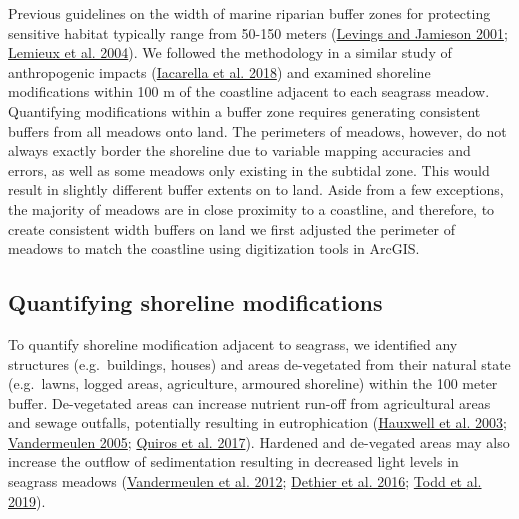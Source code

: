 \documentclass[12pt]{article}\usepackage[]{graphicx}\usepackage[]{color}
\begin{document}
Previous guidelines on the width of marine riparian buffer zones for protecting sensitive habitat typically range from 50-150 meters (\protect\hyperlink{ref-Levings2001}{Levings and Jamieson 2001}; \protect\hyperlink{ref-Lemieux2004}{Lemieux et al. 2004}). We followed the methodology in a similar study of anthropogenic impacts (\protect\hyperlink{ref-Iacarella2018}{Iacarella et al. 2018}) and examined shoreline modifications within 100 m of the coastline adjacent to each seagrass meadow. Quantifying modifications within a buffer zone requires generating consistent buffers from all meadows onto land. The perimeters of meadows, however, do not always exactly border the shoreline due to variable mapping accuracies and errors, as well as some meadows only existing in the subtidal zone. This would result in slightly different buffer extents on to land. Aside from a few exceptions, the majority of meadows are in close proximity to a coastline, and therefore, to create consistent width buffers on land we first adjusted the perimeter of meadows to match the coastline using digitization tools in ArcGIS.

\hypertarget{quantifying-shoreline-modifications}{%
\subsection{Quantifying shoreline modifications}\label{quantifying-shoreline-modifications}}

To quantify shoreline modification adjacent to seagrass, we identified any structures (e.g.~buildings, houses) and areas de-vegetated from their natural state (e.g.~lawns, logged areas, agriculture, armoured shoreline) within the 100 meter buffer. De-vegetated areas can increase nutrient run-off from agricultural areas and sewage outfalls, potentially resulting in eutrophication (\protect\hyperlink{ref-hauxwell2003}{Hauxwell et al. 2003}; \protect\hyperlink{ref-vandermeulen2005}{Vandermeulen 2005}; \protect\hyperlink{ref-Quiros2017}{Quiros et al. 2017}). Hardened and de-vegated areas may also increase the outflow of sedimentation resulting in decreased light levels in seagrass meadows (\protect\hyperlink{ref-Vandermeulen2012}{Vandermeulen et al. 2012}; \protect\hyperlink{ref-Dethier2016}{Dethier et al. 2016}; \protect\hyperlink{ref-Todd2019}{Todd et al. 2019}).
\end{document}
